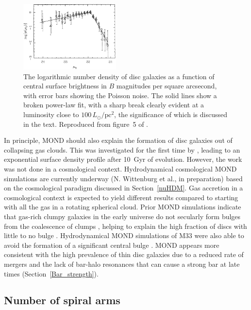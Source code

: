 \documentclass[fleqn,usenatbib,useAMS,onecolumn]{mnras} %
\begin{document}
\begin{figure}
	\centering
	\includegraphics[width=0.45\textwidth]{McGaugh_1996_Figure_5}
	\caption{The logarithmic number density of disc galaxies as a function of central surface brightness in $B$ magnitudes per square arcsecond, with error bars showing the Poisson noise. The solid lines show a broken power-law fit, with a sharp break clearly evident at a luminosity close to $100 \, L_\odot/\text{pc}^2$, the significance of which is discussed in the text. Reproduced from figure~5 of \citet{McGaugh_1996}.}
	\label{McGaugh_1996_Figure_5}
\end{figure}

In principle, MOND should also explain the formation of disc galaxies out of collapsing gas clouds. This was investigated for the first time by \citet{Wittenburg_2020}, leading to an exponential surface density profile after 10~Gyr of evolution. However, the work was not done in a cosmological context. Hydrodynamical cosmological MOND simulations are currently underway (N. Wittenburg et al., in preparation) based on the cosmological paradigm discussed in Section~\ref{nuHDM}. Gas accretion in a cosmological context is expected to yield different results compared to starting with all the gas in a rotating spherical cloud. Prior MOND simulations indicate that gas-rich clumpy galaxies in the early universe do not secularly form bulges from the coalescence of clumps \citep{Combes_2014}, helping to explain the high fraction of discs with little to no bulge \citep{Kormendy_2010}. Hydrodynamical MOND simulations of M33 were also able to avoid the formation of a significant central bulge \citep{Banik_2020_M33}. MOND appears more consistent with the high prevalence of thin disc galaxies due to a reduced rate of mergers and the lack of bar-halo resonances that can cause a strong bar at late times (Section~\ref{Bar_strength}).



\subsection{Number of spiral arms}
\label{n_spiral_arms}
\end{document}
